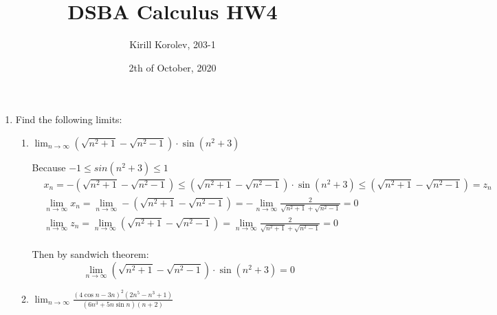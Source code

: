 \documentclass{article}
\title{DSBA Calculus HW4}
\author{Kirill Korolev, 203-1}
\date{2th of October, 2020}
\begin{document}
\maketitle

\begin{enumerate}

\item Find the following limits:

\begin{enumerate}
\item $\lim_{n \to \infty} (\sqrt{n^2 + 1} - \sqrt{n^2 - 1}) \cdot \sin{(n^2 + 3)}$


Because $-1 \leq sin(n^2 + 3) \leq 1$
\begin{align*}
&x_n = -(\sqrt{n^2 + 1} - \sqrt{n^2 - 1}) \leq (\sqrt{n^2 + 1} - \sqrt{n^2 - 1}) \cdot \sin{(n^2 + 3)} \leq (\sqrt{n^2 + 1} - \sqrt{n^2 - 1}) = z_n\\
&\lim_{n \to \infty} x_n = \lim_{n \to \infty} -(\sqrt{n^2 + 1} - \sqrt{n^2 - 1}) = -\lim_{n \to \infty} \frac{2}{\sqrt{n^2 + 1} + \sqrt{n^2 - 1}} = 0\\
&\lim_{n \to \infty} z_n = \lim_{n \to \infty} (\sqrt{n^2 + 1} - \sqrt{n^2 - 1}) = \lim_{n \to \infty} \frac{2}{\sqrt{n^2 + 1} + \sqrt{n^2 - 1}} = 0\\
\end{align*}

Then by sandwich theorem:
\[\lim_{n \to \infty} (\sqrt{n^2 + 1} - \sqrt{n^2 - 1}) \cdot \sin{(n^2 + 3)}=0\]

\item $\lim_{n \to \infty} \frac{(4\cos{n} - 3n)^2(2n^5 - n^3 + 1)}{(6n^3 + 5n\sin{n})(n + 2)}$

\end{enumerate}

\end{enumerate}
\end{document}
